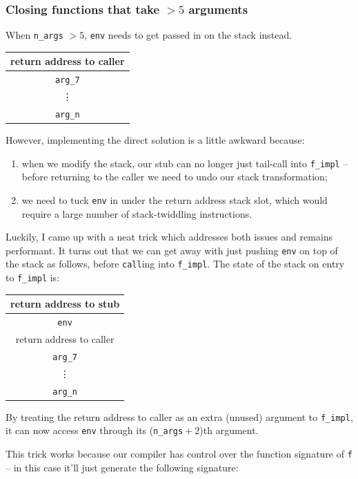 \documentclass[12pt,a4paper,twoside,openright]{report}
\begin{document}
\subsubsection{Closing functions that take $> 5$ arguments}

When \lstinline!n_args! $> 5$, \lstinline!env! needs to get passed in on the
stack instead.

\begin{tabular}{c}
  return address to caller
  \\ \hline\hline
  \lstinline!arg_7!
  \\ \hline
  \vdots
  \\ \hline
  \lstinline!arg_n!
\end{tabular}

However, implementing the direct solution is a little awkward because:
\begin{enumerate}
  \item when we modify the stack, our stub can no longer just tail-call
    into \lstinline!f_impl! -- before returning to the caller we need to undo
    our stack transformation;
  \item we need to tuck \lstinline!env! in under the return address
    stack slot, which would require a large number of stack-twiddling
    instructions.
\end{enumerate}

Luckily, I came up with a neat trick which addresses both issues and remains
performant. It turns out that we can get away with just pushing \lstinline!env!
on top of the stack as follows, before \lstinline!call!ing into
\lstinline!f_impl!. The state of the stack on entry to \lstinline!f_impl! is:

\begin{tabular}{c}
  return address to stub
  \\ \hline\hline
  \lstinline!env!
  \\ \hline
  return address to caller
  \\ \hline
  \lstinline!arg_7!
  \\ \hline
  \vdots
  \\ \hline
  \lstinline!arg_n!
\end{tabular}

By treating the return address to caller as an extra (unused) argument to
\lstinline!f_impl!, it can now access \lstinline!env! through its
(\lstinline{n_args}${}+2$)th argument.

This trick works because our compiler has control over the function signature
of \lstinline{f} -- in this case it'll just generate the following signature:
\end{document}
